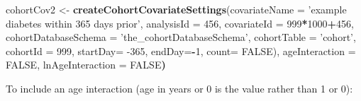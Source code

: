 \documentclass[
]{article}
\newenvironment{Shaded}{\begin{snugshade}}{\end{snugshade}}
\newcommand{\DataTypeTok}[1]{\textcolor[rgb]{0.13,0.29,0.53}{#1}}
\newcommand{\DecValTok}[1]{\textcolor[rgb]{0.00,0.00,0.81}{#1}}
\newcommand{\ErrorTok}[1]{\textcolor[rgb]{0.64,0.00,0.00}{\textbf{#1}}}
\newcommand{\KeywordTok}[1]{\textcolor[rgb]{0.13,0.29,0.53}{\textbf{#1}}}
\newcommand{\NormalTok}[1]{#1}
\newcommand{\OperatorTok}[1]{\textcolor[rgb]{0.81,0.36,0.00}{\textbf{#1}}}
\newcommand{\OtherTok}[1]{\textcolor[rgb]{0.56,0.35,0.01}{#1}}
\newcommand{\StringTok}[1]{\textcolor[rgb]{0.31,0.60,0.02}{#1}}
\begin{document}
\begin{Shaded}
\begin{Highlighting}[]
\NormalTok{cohortCov2 <-}\StringTok{ }\KeywordTok{createCohortCovariateSettings}\NormalTok{(}\DataTypeTok{covariateName =} \StringTok{'example diabetes within 365 days prior'}\NormalTok{,}
                                                        \DataTypeTok{analysisId =} \DecValTok{456}\NormalTok{,}
                                                        \DataTypeTok{covariateId =} \DecValTok{999}\OperatorTok{*}\DecValTok{1000}\OperatorTok{+}\DecValTok{456}\NormalTok{,}
                                                      \DataTypeTok{cohortDatabaseSchema =} \StringTok{'the_cohortDatabaseSchema'}\NormalTok{,}
                                                      \DataTypeTok{cohortTable =} \StringTok{'cohort'}\NormalTok{,}
                                                      \DataTypeTok{cohortId =} \DecValTok{999}\NormalTok{,}
                                                      \DataTypeTok{startDay=} \DecValTok{-365}\NormalTok{, }
                                                      \DataTypeTok{endDay=}\OperatorTok{-}\DecValTok{1}\NormalTok{,}
                                                      \DataTypeTok{count=} \OtherTok{FALSE}\NormalTok{), }
\NormalTok{                                                      ageInteraction =}\StringTok{ }\OtherTok{FALSE}\NormalTok{,}
\NormalTok{                                                      lnAgeInteraction =}\StringTok{ }\OtherTok{FALSE}\ErrorTok{)}
\end{Highlighting}
\end{Shaded}

To include an age interaction (age in years or 0 is the value rather
than 1 or 0):
\end{document}
